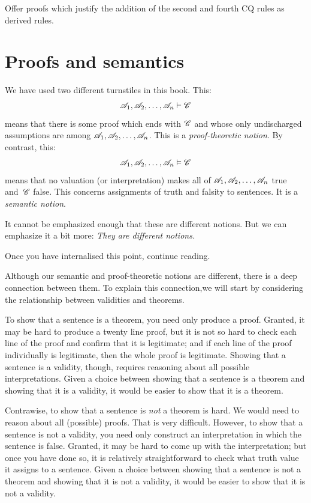 \practiceproblems

\problempart
Offer proofs which justify the addition of the second and fourth CQ rules as derived rules.



\chapter{Proofs and semantics}
We have used two different turnstiles in this book.  This:
$$\mathscr{A}_1, \mathscr{A}_2, \ldots, \mathscr{A}_n \vdash \mathscr{C}$$
means that there is some proof which ends with $\mathscr{C}$ and whose only undischarged assumptions are among $\mathscr{A}_1, \mathscr{A}_2, \ldots, \mathscr{A}_n$. This is a \emph{proof-theoretic notion}. By contrast, this: 
$$\mathscr{A}_1, \mathscr{A}_2, \ldots, \mathscr{A}_n \vDash \mathscr{C}$$
means that no valuation (or interpretation) makes all of $\mathscr{A}_1, \mathscr{A}_2, \ldots, \mathscr{A}_n$ true and~$\mathscr{C}$ false. This concerns assignments of truth and falsity to sentences. It is a \emph{semantic notion}.

It cannot be emphasized enough that these are different notions. But we can emphasize it a bit more: \emph{They are different notions.}

Once you have internalised this point, continue reading.

Although our semantic and proof-theoretic notions are different, there is a deep connection between them. To explain this connection,we will start by considering the relationship between validities and theorems.

To show that a sentence is a theorem, you need only produce a proof. Granted, it may be hard to produce a twenty line proof, but it is not so hard to check each line of the proof and confirm that it is legitimate; and if each line of the proof individually is legitimate, then the whole proof is legitimate. Showing that a sentence is a validity, though, requires reasoning about all possible interpretations. Given a choice between showing that a sentence is a theorem and showing that it is a validity, it would be easier to show that it is a theorem.

Contrawise, to show that a sentence is \emph{not} a theorem is hard. We would need to reason about all (possible) proofs. That is very difficult. However, to show that a sentence is not a validity, you need only construct an interpretation in which the sentence is false. Granted, it may be hard to come up with the interpretation; but once you have done so, it is relatively straightforward to check what truth value it assigns to a sentence. Given a choice between showing that a sentence is not a theorem and showing that it is not a validity, it would be easier to show that it is not a validity.

